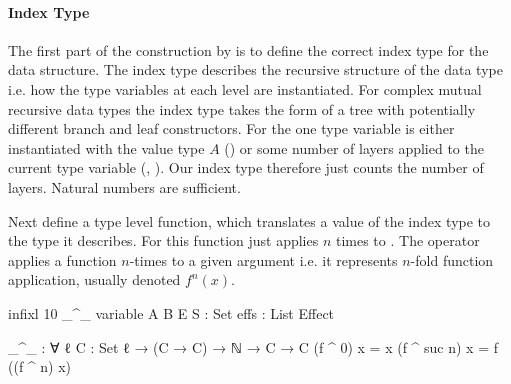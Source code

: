 \paragraph{Index Type} The first part of the construction by
\textcite{DBLP:journals/corr/abs-1806-05230} is to define the correct index type
for the data structure.
The index type describes the recursive structure of the data type i.e. how the
type variables at each level are instantiated.
For complex mutual recursive data types the index type takes the form of a tree
with potentially different branch and leaf constructors.
For \AgdaSpace{}
the one type variable is either instantiated with the value type $A$
() or some number of
\AgdaSpace{} layers applied to
the current type variable (,
).
Our index type therefore just counts the number of
\AgdaSpace{} layers.
Natural numbers are sufficient.

Next \textcite{DBLP:journals/corr/abs-1806-05230} define a type level function,
which translates a value of the index type to the type it describes.
For
\AgdaSpace{}\AgdaSpace{}
this function just applies \AgdaSpace{}
$n$ times to .
The operator \AgdaFunction{\_\textasciicircum\_} applies a function $n$-times to
a given argument  i.e. it represents $n$-fold function
application, usually denoted $f^n(x)$.

\begin{code}[hide]
infixl 10 _^_
variable
  A B E S : Set
  effs : List Effect
\end{code}
\begin{code}
_^_ : ∀ {ℓ} {C : Set ℓ} → (C → C) → ℕ → C → C
(f ^ 0)      x = x
(f ^ suc n)  x = f ((f ^ n) x)
\end{code}

